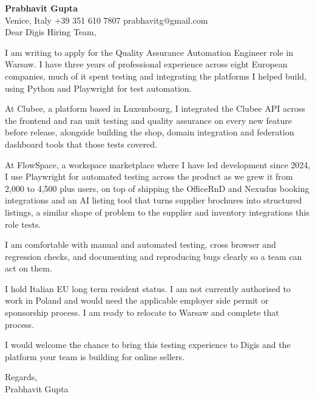 \documentclass[a4paper,10.5pt]{article}
\begin{document}
\textbf{Prabhavit Gupta}\\
Venice, Italy \textbar{} +39 351 610 7807 \textbar{} prabhavitg@gmail.com\\[10pt]
Dear Digis Hiring Team,

I am writing to apply for the Quality Assurance Automation Engineer role in Warsaw. I have three years of professional experience across eight European companies, much of it spent testing and integrating the platforms I helped build, using Python and Playwright for test automation.

At Clubee, a platform based in Luxembourg, I integrated the Clubee API across the frontend and ran unit testing and quality assurance on every new feature before release, alongside building the shop, domain integration and federation dashboard tools that those tests covered.

At FlowSpace, a workspace marketplace where I have led development since 2024, I use Playwright for automated testing across the product as we grew it from 2,000 to 4,500 plus users, on top of shipping the OfficeRnD and Nexudus booking integrations and an AI listing tool that turns supplier brochures into structured listings, a similar shape of problem to the supplier and inventory integrations this role tests.

I am comfortable with manual and automated testing, cross browser and regression checks, and documenting and reproducing bugs clearly so a team can act on them.

I hold Italian EU long term resident status. I am not currently authorised to work in Poland and would need the applicable employer side permit or sponsorship process. I am ready to relocate to Warsaw and complete that process.

I would welcome the chance to bring this testing experience to Digis and the platform your team is building for online sellers.

Regards,\\
Prabhavit Gupta
\end{document}
